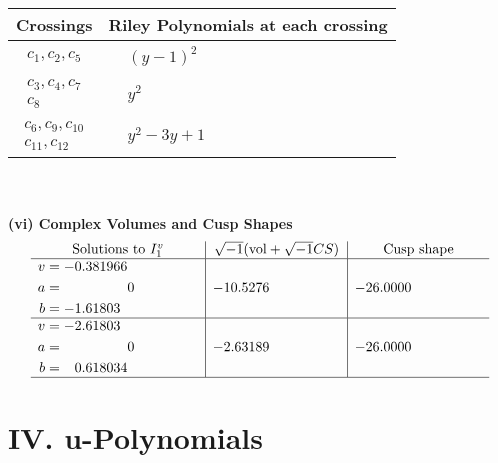 \documentclass[1p]{elsarticle_modified}
\theoremstyle{definition}
\newcommand{\I}{\sqrt{-1}}
\begin{document}
\begin{tabular}{m{50pt}|m{274pt}}
Crossings & \hspace{64pt}Riley Polynomials at each crossing \\
\hline $$\begin{aligned}c_{1},c_{2},c_{5}\end{aligned}$$&$\begin{aligned}
&(y-1)^2
\end{aligned}$\\
\hline $$\begin{aligned}c_{3},c_{4},c_{7}\\c_{8}\end{aligned}$$&$\begin{aligned}
&y^2
\end{aligned}$\\
\hline $$\begin{aligned}c_{6},c_{9},c_{10}\\c_{11},c_{12}\end{aligned}$$&$\begin{aligned}
&y^2-3 y+1
\end{aligned}$\\
\hline
\end{tabular}\\~\\
\newpage\flushleft \textbf{(vi) Complex Volumes and Cusp Shapes}
$$\begin{array}{c|c|c}  
\text{Solutions to }I^v_{1}& \I (\text{vol} + \sqrt{-1}CS) & \text{Cusp shape}\\
 \hline 
\begin{aligned}
v &= -0.381966\phantom{ +0.000000I} \\
a &= \phantom{-0.000000 } 0 \\
b &= -1.61803\phantom{ +0.000000I}\end{aligned}
 & -10.5276\phantom{ +0.000000I} & -26.0000\phantom{ +0.000000I} \\ \hline\begin{aligned}
v &= -2.61803\phantom{ +0.000000I} \\
a &= \phantom{-0.000000 } 0 \\
b &= \phantom{-}0.618034\phantom{ +0.000000I}\end{aligned}
 & -2.63189\phantom{ +0.000000I} & -26.0000\phantom{ +0.000000I}\\
 \hline 
 \end{array}$$\newpage
\newpage\renewcommand{\arraystretch}{1}
\centering \section*{ IV. u-Polynomials}
\end{document}
